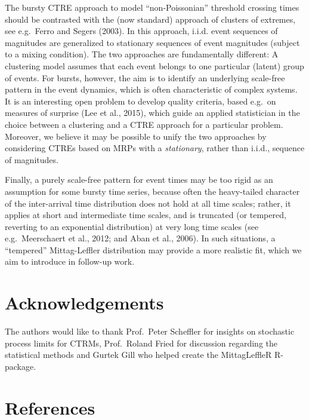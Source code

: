 \documentclass[]{elsarticle} %
\begin{document}
The bursty CTRE approach to model ``non-Poissonian'' threshold crossing
times should be contrasted with the (now standard) approach of clusters
of extremes, see e.g.~Ferro and Segers (2003). In this approach, i.i.d.
event sequences of magnitudes are generalized to stationary sequences of
event magnitudes (subject to a mixing condition). The two approaches are
fundamentally different: A clustering model assumes that each event
belongs to one particular (latent) group of events. For bursts, however,
the aim is to identify an underlying scale-free pattern in the event
dynamics, which is often characteristic of complex systems. It is an
interesting open problem to develop quality criteria, based e.g.~on
measures of surprise (Lee et al., 2015), which guide an applied
statistician in the choice between a clustering and a CTRE approach for
a particular problem. Moreover, we believe it may be possible to unify
the two approaches by considering CTREs based on MRPs with a
\emph{stationary}, rather than i.i.d., sequence of magnitudes.

Finally, a purely scale-free pattern for event times may be too rigid as
an assumption for some bursty time series, because often the
heavy-tailed character of the inter-arrival time distribution does not
hold at all time scales; rather, it applies at short and intermediate
time scales, and is truncated (or tempered, reverting to an exponential
distribution) at very long time scales (see e.g.~Meerschaert et al.,
2012; and Aban et al., 2006). In such situations, a ``tempered''
Mittag-Leffler distribution may provide a more realistic fit, which we
aim to introduce in follow-up work.

\hypertarget{acknowledgements}{%
\section*{Acknowledgements}\label{acknowledgements}}

The authors would like to thank Prof.~Peter Scheffler for insights on
stochastic process limits for CTRMs, Prof.~Roland Fried for discussion
regarding the statistical methods and Gurtek Gill who helped create the
MittagLeffleR R-package.

\newpage

\hypertarget{references}{%
\section*{References}\label{references}}
\end{document}
